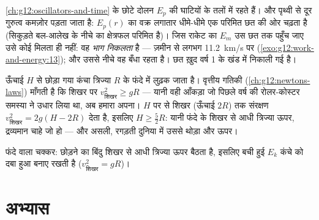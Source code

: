 \begin{remark}[दोलन और पलायन]\label{rem:g12:work-and-energy:escape}
\cref{ch:g12:oscillators-and-time} के छोटे दोलन $E_p$ की घाटियों के तलों में रहते हैं। और पृथ्वी से
दूर गुरुत्व कमज़ोर पड़ता जाता है: $E_p(r)$ का वक्र लगातार धीमे-धीमे एक परिमित छत
की ओर चढ़ता है (सिकुड़ते बल-आलेख के नीचे का क्षेत्रफल परिमित है)। जिस राकेट का
$E_m$ उस छत तक पहुँच जाए उसे कोई  मिलता ही नहीं: वह
\emph{भाग निकलता} है --- ज़मीन से लगभग \qty{11.2}{km/s} पर (\cref{exo:g12:work-and-energy:13});
और उससे नीचे वह बँधा रहता है। छत ख़ुद वर्ष 1 के खंड में निकाली गई है।
\end{remark}

\begin{example}[फंदे वाला चक्कर]\label{ex:g12:work-and-energy:loop}
ऊँचाई $H$ से छोड़ा गया कंचा त्रिज्या $R$ के  फंदे में लुढ़क
जाता है। वृत्तीय गतिकी (\cref{ch:g12:newtons-laws}) माँगती है कि शिखर पर $v_{\text{शिखर}}^2 \geq gR$ --- यानी वही
आँकड़ा जो पिछले वर्ष की रोलर-कोस्टर समस्या ने उधार लिया था, अब हमारा अपना।
$H$ पर  से शिखर (ऊँचाई $2R$) तक संरक्षण $v_{\text{शिखर}}^2 = 2g(H - 2R)$ देता है, इसलिए
$H \geq \tfrac52 R$: यानी फंदे के शिखर से आधी त्रिज्या ऊपर, द्रव्यमान चाहे जो हो --- और
असली, रगड़ती दुनिया में उससे थोड़ा और ऊपर।
\end{example}

\begin{omfigure}

{\small फंदे वाला चक्कर: छोड़ने का बिंदु शिखर से आधी त्रिज्या ऊपर बैठता है,
इसलिए बची हुई $E_k$ कंचे को दबा हुआ बनाए रखती है ($v_{\text{शिखर}}^2 = gR$)।}
\end{omfigure}

\section{अभ्यास}

